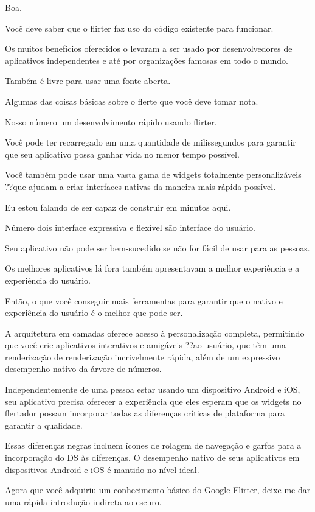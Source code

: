 Boa.

Você deve saber que o flirter faz uso do código existente para funcionar.

Os muitos benefícios oferecidos o levaram a ser usado por desenvolvedores de aplicativos independentes e até por organizações famosas em todo o mundo.

Também é livre para usar uma fonte aberta.

Algumas das coisas básicas sobre o flerte que você deve tomar nota.

Nosso número um desenvolvimento rápido usando flirter.

Você pode ter recarregado em uma quantidade de milissegundos para garantir que seu aplicativo possa ganhar vida no menor tempo possível.

Você também pode usar uma vasta gama de widgets totalmente personalizáveis ??que ajudam a criar interfaces nativas da maneira mais rápida possível.

Eu estou falando de ser capaz de construir em minutos aqui.

Número dois interface expressiva e flexível são interface do usuário.

Seu aplicativo não pode ser bem-sucedido se não for fácil de usar para as pessoas.

Os melhores aplicativos lá fora também apresentavam a melhor experiência e a experiência do usuário.

Então, o que você conseguir mais ferramentas para garantir que o nativo e experiência do usuário é o melhor que pode ser.

A arquitetura em camadas oferece acesso à personalização completa, permitindo que você crie aplicativos interativos e amigáveis ??ao usuário, que têm uma renderização de renderização incrivelmente rápida, além de um expressivo desempenho nativo da árvore de números.

Independentemente de uma pessoa estar usando um dispositivo Android e iOS, seu aplicativo precisa oferecer a experiência que eles esperam que os widgets no flertador possam incorporar todas as diferenças críticas de plataforma para garantir a qualidade.

Essas diferenças negras incluem ícones de rolagem de navegação e garfos para a incorporação do DS às diferenças. O desempenho nativo de seus aplicativos em dispositivos Android e iOS é mantido no nível ideal.

Agora que você adquiriu um conhecimento básico do Google Flirter, deixe-me dar uma rápida introdução indireta ao escuro.



